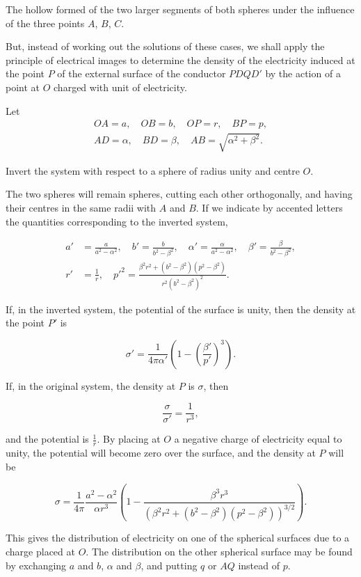\documentclass[11pt,a4paper]{article}
\begin{document}
The hollow formed of the two larger segments of both spheres under the
influence of the three points $A$, $B$, $C$.

But, instead of working out the solutions of these cases, we shall
apply the principle of electrical images to determine the density of
the electricity induced at the point $P$ of the external surface of the
conductor $PDQD'$ by the action of a point at $O$ charged with unit of
electricity.

Let 
\[
\begin{gathered}
OA=a,\quad OB=b,\quad OP=r,\quad BP=p,\\
AD=\alpha,\quad BD=\beta,\quad AB=\sqrt{\alpha^2+\beta^2}.
\end{gathered}
\]

Invert the system with respect to a sphere of radius unity and centre
$O$.

The two spheres will remain spheres, cutting each other orthogonally,
and having their centres in the same radii with $A$ and $B$. If we
indicate by accented letters the quantities corresponding to the
inverted system,

\[
\begin{aligned}
a' &= \frac{a}{a^2-\alpha^2}, \quad
b' = \frac{b}{b^2-\beta^2}, \quad
\alpha' = \frac{\alpha}{a^2-\alpha^2}, \quad
\beta' = \frac{\beta}{b^2-\beta^2}, \\
r' &= \frac{1}{r}, \quad
p'^2 = \frac{\beta^2 r^2+(b^2-\beta^2)(p^2-\beta^2)}
{r^2(b^2-\beta^2)^2}.
\end{aligned}
\]

\setcounter{footnote}{0}
If, in the inverted system, the potential of the surface is unity, then
the density at the point $P'$ is

\[
\sigma'=\frac{1}{4\pi\alpha'}
\left(1-\left(\frac{\beta'}{p'}\right)^3\right).
\]

If, in the original system, the density at $P$ is $\sigma$, then

\[
\frac{\sigma}{\sigma'} = \frac{1}{r^3},
\]

and the potential is $\frac{1}{r}$. By placing at $O$ a negative
charge of electricity equal to unity, the potential will become zero
over the surface, and the density at $P$ will be

\[
\sigma=\frac{1}{4\pi}\frac{a^2-\alpha^2}{\alpha r^3}
\left(1-\frac{\beta^3r^3}
{\left(\beta^2r^2+(b^2-\beta^2)(p^2-\beta^2)\right)^{3/2}}\right).
\]

This gives the distribution of electricity on one of the spherical
surfaces due to a charge placed at $O$. The distribution on the other
spherical surface may be found by exchanging $a$ and $b$, $\alpha$ and
$\beta$, and putting $q$ or $AQ$ instead of $p$.
\end{document}
